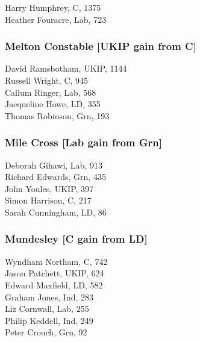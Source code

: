 \documentclass[a4paper,openany,10pt]{book}
\begin{document}
Harry Humphrey, C, 1375\\
Heather Fouracre, Lab, 723\\


\subsubsection*{Melton Constable \hspace*{\fill}\nolinebreak[1]%
\enspace\hspace*{\fill}
[UKIP gain from C]}



David Ramsbotham, UKIP, 1144\\
Russell Wright, C, 945\\
Callum Ringer, Lab, 568\\
Jacqueline Howe, LD, 355\\
Thomas Robinson, Grn, 193\\


\subsubsection*{Mile Cross \hspace*{\fill}\nolinebreak[1]%
\enspace\hspace*{\fill}
[Lab gain from Grn]}



Deborah Gihawi, Lab, 913\\
Richard Edwards, Grn, 435\\
John Youles, UKIP, 397\\
Simon Harrison, C, 217\\
Sarah Cunningham, LD, 86\\


\subsubsection*{Mundesley \hspace*{\fill}\nolinebreak[1]%
\enspace\hspace*{\fill}
[C gain from LD]}



Wyndham Northam, C, 742\\
Jason Patchett, UKIP, 624\\
Edward Maxfield, LD, 582\\
Graham Jones, Ind, 283\\
Liz Cornwall, Lab, 255\\
Philip Keddell, Ind, 249\\
Peter Crouch, Grn, 92\\
\end{document}
